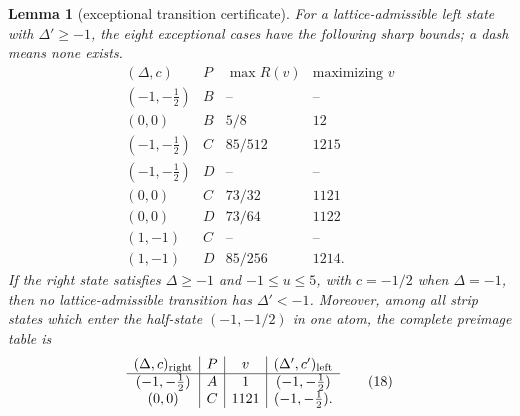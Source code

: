 \documentclass[11pt]{article}
\newtheorem{lemma}[theorem]{Lemma}
\begin{document}
\newpage
\begin{lemma}[exceptional transition certificate]
For a lattice-admissible left state with $\Delta'\geq-1$, the eight
exceptional cases have the following sharp bounds; a dash means none exists.
\[
\begin{array}{c|c|c|c}
(\Delta,c)&P&\max R(v)&\text{maximizing }v\\ \hline
(-1,-\tfrac12)&B&\text{--}&\text{--}\\
(0,0)&B&5/8&12\\ \hline
(-1,-\tfrac12)&C&85/512&1215\\
(-1,-\tfrac12)&D&\text{--}&\text{--}\\
(0,0)&C&73/32&1121\\
(0,0)&D&73/64&1122\\
(1,-1)&C&\text{--}&\text{--}\\
(1,-1)&D&85/256&1214.
\end{array}
\tag{17}
\]
If the right state satisfies $\Delta\geq-1$ and $-1\leq u\leq5$, with
$c=-1/2$ when $\Delta=-1$, then no lattice-admissible transition has
$\Delta'<-1$.
Moreover, among all strip states which enter the half-state
$(-1,-1/2)$ in one atom, the complete preimage table is
\[
\begin{array}{c|c|c|c}
(\Delta,c)_{\rm right}&P&v&(\Delta',c')_{\rm left}\\ \hline
(-1,-\tfrac12)&A&1&(-1,-\tfrac12)\\
(0,0)&C&1121&(-1,-\tfrac12).
\end{array}
\tag{18}
\]
\end{lemma}
\end{document}
